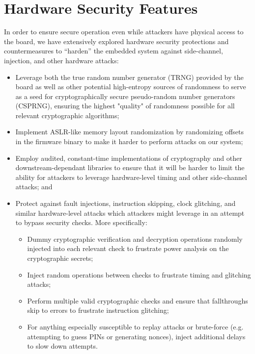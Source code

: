 \section{Hardware Security Features}
\label{sec:hw-features}


In order to ensure secure operation even while attackers have physical access to the board, we have extensively explored hardware security protections and countermeasures to ``harden'' the embedded system against side-channel, injection, and other hardware attacks:
\iflong
\begin{itemize}
    \item Leverage both the true random number generator (TRNG) provided by the board as well as other potential high-entropy sources of randomness to serve as a seed for cryptographically secure pseudo-random number generators (CSPRNG), ensuring the highest "quality" of randomness possible for all relevant cryptographic algorithms;
    \item Implement ASLR-like memory layout randomization by randomizing offsets in the firmware binary to make it harder to perform attacks on our system;
    \item Employ audited, constant-time implementations of cryptography and other downstream-dependant libraries to ensure that it will be harder to limit the ability for attackers to leverage hardware-level timing and other side-channel attacks; and 
    \item Protect against fault injections, instruction skipping, clock glitching, and similar hardware-level attacks which attackers might leverage in an attempt to bypass security checks.
    \iflong
    More specifically:
    \begin{itemize}
        \item Dummy cryptographic verification and decryption operations randomly injected into each relevant check to frustrate power analysis on the cryptographic secrets;
        \item Inject random operations between checks to frustrate timing and glitching attacks;
        \item Perform multiple valid cryptographic checks and ensure that fallthroughs skip to errors to frustrate instruction glitching;
        \item For anything especially susceptible to replay attacks or brute-force (e.g. attempting to guess PINs or generating nonces), inject additional delays to slow down attempts.
    \end{itemize}
    \fi
\end{itemize}
